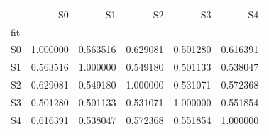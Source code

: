 \begin{tabular}{lrrrrr}
\toprule
 & S0 & S1 & S2 & S3 & S4 \\
fit &  &  &  &  &  \\
\midrule
S0 & 1.000000 & 0.563516 & 0.629081 & 0.501280 & 0.616391 \\
S1 & 0.563516 & 1.000000 & 0.549180 & 0.501133 & 0.538047 \\
S2 & 0.629081 & 0.549180 & 1.000000 & 0.531071 & 0.572368 \\
S3 & 0.501280 & 0.501133 & 0.531071 & 1.000000 & 0.551854 \\
S4 & 0.616391 & 0.538047 & 0.572368 & 0.551854 & 1.000000 \\
\bottomrule
\end{tabular}
